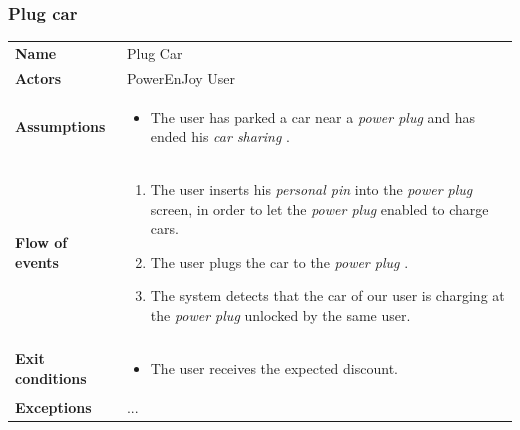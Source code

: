\documentclass[english]{article}
\newcommand{\carsharing}{\textit {car sharing }}
\newcommand{\powerplug}{\textit{power plug }}
\newcommand{\personalpin}{\textit{personal pin }}
\begin{document}
\subsubsection{Plug car}
	\begin{center}
	\begin{tabular}{l||p{10cm}}
	\textbf{Name} 
		& Plug Car\\ [8px]
	\textbf{Actors} 
		& PowerEnJoy User\\ [8px]
	\textbf{Assumptions} 
	& \begin{itemize}
		\item The user has parked a car near a \powerplug and has ended his \carsharing. 
	\end{itemize}\\
	\textbf{Flow of events}
		& \begin{enumerate}
 			\item The user inserts his \personalpin into the \powerplug screen, in order to let the \powerplug enabled to charge cars.
			\item The user plugs the car to the \powerplug.
			\item The system detects that the car of our user is charging at the \powerplug unlocked by the same user. 
		\end{enumerate}\\ 
	\textbf{Exit conditions}
		&\begin{itemize}
			\item The user receives the expected discount.
		\end{itemize}\\
	\textbf{Exceptions}
		&...\\[8px]
	\end{tabular}
	\end{center}
\end{document}
